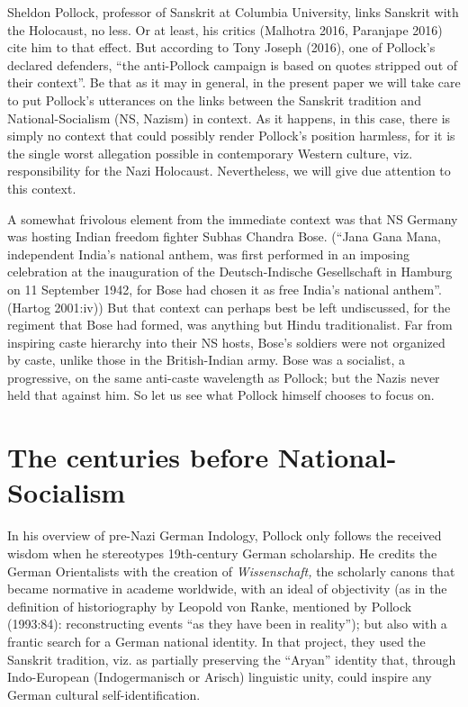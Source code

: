 Sheldon Pollock, professor of Sanskrit at Columbia University, links Sanskrit with the Holocaust, no less. Or at least, his critics (Malhotra 2016, Paranjape 2016) cite him to that effect. But according to Tony Joseph (2016), one of Pollock’s declared defenders, “the anti-Pollock campaign is based on quotes stripped out of their context”. Be that as it may in general, in the present paper we will take care to put Pollock’s utterances on the links between the Sanskrit tradition and National-Socialism (NS, Nazism) in context. As it happens, in this case, there is simply no context that could possibly render Pollock’s position harmless, for it is the single worst allegation possible in contemporary Western culture, viz. responsibility for the Nazi Holocaust. Nevertheless, we will give due attention to this context.

A somewhat frivolous element from the immediate context was that NS Germany was hosting Indian freedom fighter Subhas Chandra Bose. (“Jana Gana Mana, independent India’s national anthem, was first performed in an imposing celebration at the inauguration of the Deutsch-Indische Gesellschaft in Hamburg on 11 September 1942, for Bose had chosen it as free India’s national anthem”. (Hartog 2001:iv))  But that context can perhaps best be left undiscussed, for the regiment that Bose had formed, was anything but Hindu traditionalist. Far from inspiring caste hierarchy into their NS hosts, Bose’s soldiers were not organized by caste, unlike those in the British-Indian army. Bose was a socialist, a progressive, on the same anti-caste wavelength as Pollock; but the Nazis never held that against him. So let us see what Pollock himself chooses to focus on.

\section*{The centuries before National-Socialism}

In his overview of pre-Nazi German Indology, Pollock only follows the received wisdom when he stereotypes 19th-century German scholarship. He credits the German Orientalists with the creation of {\sl Wissenschaft,} the scholarly canons that became normative in academe worldwide, with an ideal of objectivity (as in the definition of historiography by Leopold von Ranke, mentioned by Pollock (1993:84): reconstructing events “as they have been in reality”); but also with a frantic search for a German national identity. In that project, they used the Sanskrit tradition, viz. as partially preserving the “Aryan” identity that, through Indo-European (Indogermanisch or Arisch) linguistic unity, could inspire any German cultural self-identification.

